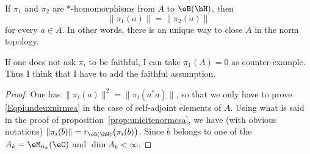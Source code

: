 \begin{lemma}
	If $\pi_1$ and $\pi_2$ are $*$-homomorphisms from $A$ to $\oB(\hH)$, then
	\begin{equation}		\label{Eqpiundeuxnirmea}
		\| \pi_1(a) \|=\| \pi_2(a) \|
	\end{equation}
	for every $a\in A$. In other words, there is an unique way to close $A$ in the norm topology.
\end{lemma}

\begin{probleme}
	If one does not ask $\pi_i$ to be faithful, I can take $\pi_1(A)=0$ as counter-example. Thus I think that I have to add the faithful assumption.
\end{probleme}

\begin{proof}
	One has $\| \pi_i(a) \|^2=\| \pi_i(a^*a) \|$, so that we only have to prove \eqref{Eqpiundeuxnirmea} in the case of self-adjoint elements of $A$. Using what is said in the proof of proposition~\ref{prop:unicitenormcsa}, we have (with obvious notations) $\| \pi_i(b) \|=r_{\oB(\hH)}\big( \pi_i(b) \big)$. Since $b$ belongs to one of the $A_k=\eM_{n_k}(\eC)$ and $\dim A_k <\infty$.

\end{proof}

